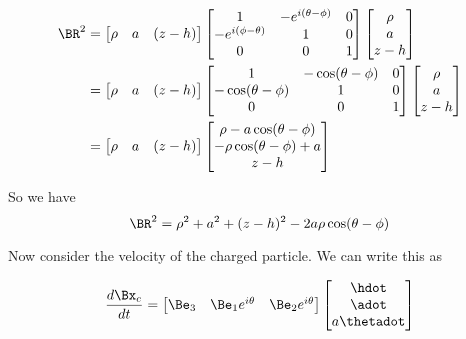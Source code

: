 \begin{align*}
\BR^2 
&=
\begin{bmatrix}
\rho &
a & 
(z - h)
\end{bmatrix}
\begin{bmatrix}
1 & - e^{i(\theta-\phi)} & 0 \\
- e^{i(\phi -\theta)} & 1 & 0 \\
0 & 0 & 1 \\
\end{bmatrix}
\begin{bmatrix}
\rho \\
a \\
z - h
\end{bmatrix} \\
&=
\begin{bmatrix}
\rho &
a & 
(z - h)
\end{bmatrix}
\begin{bmatrix}
1 & - \cos(\theta-\phi) & 0 \\
- \cos(\theta -\phi) & 1 & 0 \\
0 & 0 & 1 \\
\end{bmatrix}
\begin{bmatrix}
\rho \\
a \\
z - h
\end{bmatrix} \\
&=
\begin{bmatrix}
\rho &
a & 
(z - h)
\end{bmatrix}
\begin{bmatrix}
\rho - a \cos(\theta - \phi) \\
- \rho \cos(\theta - \phi) + a \\
z - h
\end{bmatrix}
\end{align*}

So we have
\begin{equation}\label{eqn:matrixVectorPotentials:n}
\BR^2 = \rho^2 + a^2 + (z -h)^2 - 2 a \rho \cos(\theta - \phi)
\end{equation}

Now consider the velocity of the charged particle.  We can write this as

\begin{equation}\label{eqn:matrixVectorPotentials:n}
\frac{d \Bx_c}{dt} = 
\begin{bmatrix}
\Be_3 & \Be_1 e^{i \theta} & \Be_2 e^{i\theta}
\end{bmatrix}
\begin{bmatrix}
\hdot \\
\adot \\
a \thetadot
\end{bmatrix}
\end{equation}

